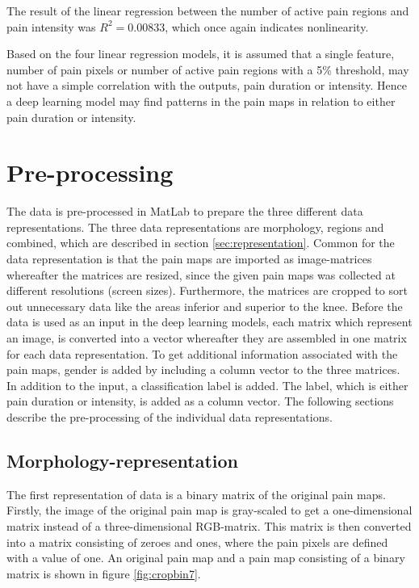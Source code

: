 \noindent
The result of the linear regression between the number of active pain regions and pain intensity was $R^2=0.00833$, which once again indicates nonlinearity. 

\noindent
Based on the four linear regression models, it is assumed that a single feature, number of pain pixels or number of active pain regions with a 5\% threshold, may not have a simple correlation with the outputs, pain duration or intensity. Hence a deep learning model may find patterns in the pain maps in relation to either pain duration or intensity.



\section{Pre-processing} \label{sec:prepros}
The data is pre-processed in MatLab to prepare the three different data representations. The three data representations are morphology, regions and combined, which are described in section \ref{sec:representation}. Common for the data representation is that the pain maps are imported as image-matrices whereafter the matrices are resized, since the given pain maps was collected at different resolutions (screen sizes). Furthermore, the matrices are cropped to sort out unnecessary data like the areas inferior and superior to the knee.
Before the data is used as an input in the deep learning models, each matrix which represent an image, is converted into a vector whereafter they are assembled in one matrix for each data representation. To get additional information associated with the pain maps, gender is added by including a column vector to the three matrices.
In addition to the input, a classification label is added. The label, which is either pain duration or intensity, is added as a column vector.
The following sections describe the pre-processing of the individual data representations.

\subsection{Morphology-representation} \label{sec:Morph}
The first representation of data is a binary matrix of the original pain maps.
Firstly, the image of the original pain map is gray-scaled to get a one-dimensional matrix instead of a three-dimensional RGB-matrix. This matrix is then converted into a matrix consisting of zeroes and ones, where the pain pixels are defined with a value of one. An original pain map and a pain map consisting of a binary matrix is shown in figure \ref{fig:cropbin7}.


